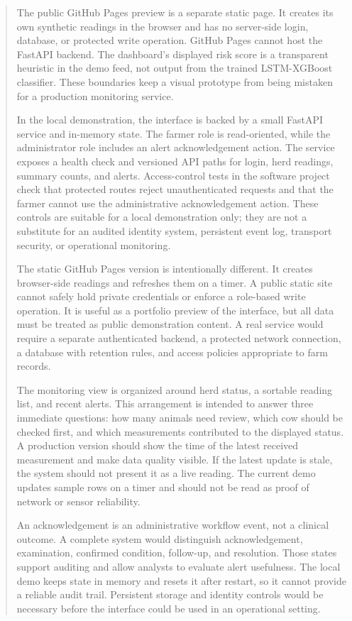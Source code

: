 \documentclass[journal]{IEEEtran}
\begin{document}
\begin{abstract}
The public GitHub Pages preview is a separate static page. It creates its own synthetic readings in the browser and has no server-side login, database, or protected write operation. GitHub Pages cannot host the FastAPI backend. The dashboard's displayed risk score is a transparent heuristic in the demo feed, not output from the trained LSTM-XGBoost classifier. These boundaries keep a visual prototype from being mistaken for a production monitoring service.

In the local demonstration, the interface is backed by a small FastAPI service and in-memory state. The farmer role is read-oriented, while the administrator role includes an alert acknowledgement action. The service exposes a health check and versioned API paths for login, herd readings, summary counts, and alerts. Access-control tests in the software project check that protected routes reject unauthenticated requests and that the farmer cannot use the administrative acknowledgement action. These controls are suitable for a local demonstration only; they are not a substitute for an audited identity system, persistent event log, transport security, or operational monitoring.

The static GitHub Pages version is intentionally different. It creates browser-side readings and refreshes them on a timer. A public static site cannot safely hold private credentials or enforce a role-based write operation. It is useful as a portfolio preview of the interface, but all data must be treated as public demonstration content. A real service would require a separate authenticated backend, a protected network connection, a database with retention rules, and access policies appropriate to farm records.

The monitoring view is organized around herd status, a sortable reading list, and recent alerts. This arrangement is intended to answer three immediate questions: how many animals need review, which cow should be checked first, and which measurements contributed to the displayed status. A production version should show the time of the latest received measurement and make data quality visible. If the latest update is stale, the system should not present it as a live reading. The current demo updates sample rows on a timer and should not be read as proof of network or sensor reliability.

An acknowledgement is an administrative workflow event, not a clinical outcome. A complete system would distinguish acknowledgement, examination, confirmed condition, follow-up, and resolution. Those states support auditing and allow analysts to evaluate alert usefulness. The local demo keeps state in memory and resets it after restart, so it cannot provide a reliable audit trail. Persistent storage and identity controls would be necessary before the interface could be used in an operational setting.


\end{abstract}
\end{document}
